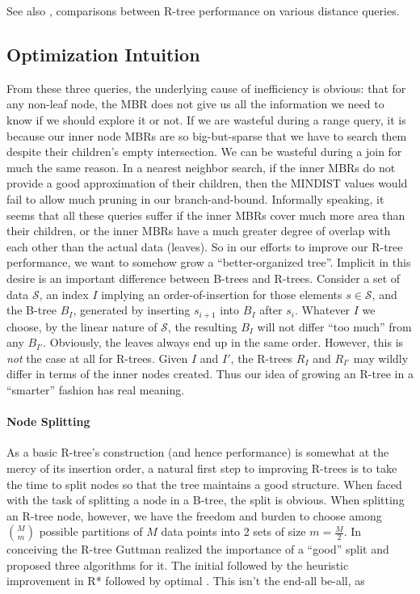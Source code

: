 See also \cite{corralalmendros-jimenez07}, comparisons between R-tree performance on various distance queries.

\subsection{Optimization Intuition}
From these three queries, the underlying cause of inefficiency is obvious: that for any non-leaf node, the MBR does not give us all the information we need to know if we should explore it or not.
If we are wasteful during a range query, it is because our inner node MBRs are so big-but-sparse that we have to search them despite their children's empty intersection.
We can be wasteful during a join for much the same reason.
In a nearest neighbor search, if the inner MBRs do not provide a good approximation of their children, then the MINDIST values would fail to allow much pruning in our branch-and-bound.
Informally speaking, it seems that all these queries suffer if the inner MBRs cover much more area than their children, or the inner MBRs have a much greater degree of overlap with each other than the actual data (leaves).
So in our efforts to improve our R-tree performance, we want to somehow grow a ``better-organized tree''.
Implicit in this desire is an important difference between B-trees and R-trees.
Consider a set of data $\mathcal S$, an index $I$ implying an order-of-insertion for those elements $s\in \mathcal S$, and the B-tree $B_I$, generated by inserting $s_{i+1}$ into $B_I$ after $s_{i}$.
Whatever $I$ we choose, by the linear nature of $\mathcal S$, the resulting $B_I$ will not differ ``too much'' from any $B_{I\prime}$.
Obviously, the leaves always end up in the same order.
However, this is \emph{not} the case at all for R-trees.
Given $I$ and $I\prime$, the R-trees $R_I$ and $R_{I\prime}$ may wildly differ in terms of the inner nodes created.
Thus our idea of growing an R-tree in a ``smarter'' fashion has real meaning.

\paragraph{Node Splitting}
As a basic R-tree's construction (and hence performance) is somewhat at the mercy of its insertion order, a natural first step to improving R-trees is to take the time to split nodes so that the tree maintains a good structure.
When faced with the task of splitting a node in a B-tree, the split is obvious.
When splitting an R-tree node, however, we have the freedom and burden to choose among $\binom{M}{m}$ possible partitions of $M$ data points into 2 sets of size $m=\frac{M}{2}$.
In conceiving the R-tree Guttman realized the importance of a ``good'' split and proposed three algorithms for it.
The initial \cite{guttman84} followed by the heuristic improvement in R* \cite{beckmannkriegelschneiderseeger90} followed by optimal \cite{garcialopezleutenegger98}.
This isn't the end-all be-all, as 

